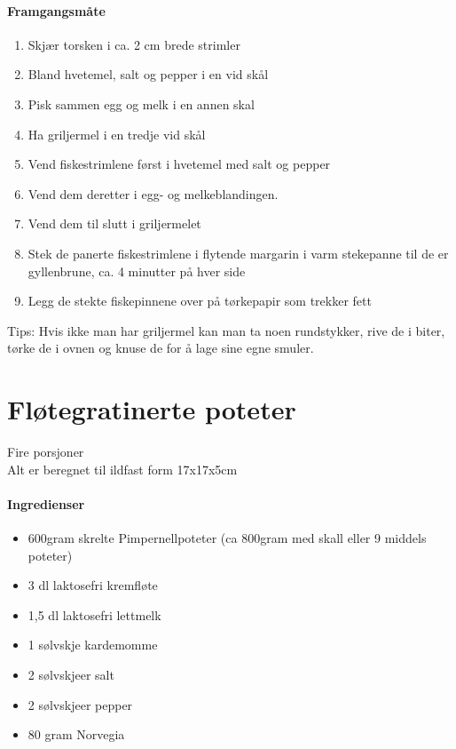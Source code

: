 \documentclass[12pt,a4paper]{book}
\begin{document}
\paragraph{Framgangsmåte}
\begin{enumerate}[noitemsep]
	\item Skjær torsken i ca. 2 cm brede strimler
	\item Bland hvetemel, salt og pepper i en vid skål
	\item Pisk sammen egg og melk i en annen skal
	\item Ha griljermel i en tredje vid skål
	\item Vend fiskestrimlene først i hvetemel med salt og pepper
	\item Vend dem deretter i egg- og melkeblandingen.
	\item Vend dem til slutt i griljermelet
	\item Stek de panerte fiskestrimlene i flytende margarin i varm stekepanne til de er gyllenbrune, ca. 4 minutter på hver side
	\item Legg de stekte fiskepinnene over på tørkepapir som trekker fett
\end{enumerate}

Tips: Hvis ikke man har griljermel kan man ta noen rundstykker, rive de i biter, tørke de i ovnen og knuse de for å lage sine egne smuler.
\clearpage{}
\clearpage{}\section{﻿Fløtegratinerte poteter}
\label{flotegratinerte}
Fire porsjoner\\
Alt er beregnet til ildfast form 17x17x5cm

\paragraph{Ingredienser}
\begin{itemize}[noitemsep]
	\item 600gram skrelte Pimpernellpoteter (ca 800gram med skall eller 9 middels poteter)
	\item	3 dl laktosefri kremfløte
	\item 1,5 dl laktosefri lettmelk
	\item 1 sølvskje kardemomme
	\item 2 sølvskjeer salt
	\item 2 sølvskjeer pepper
	\item 80 gram Norvegia
\end{itemize}
\end{document}
